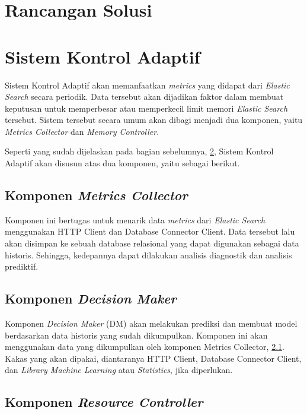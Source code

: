\section{Rancangan Solusi}

\section{Sistem Kontrol Adaptif}
\label{sec:sistemkontroladaptif}

Sistem Kontrol Adaptif akan memanfaatkan \textit{metrics} yang didapat dari \textit{Elastic Search} secara periodik. Data tersebut akan dijadikan faktor dalam membuat keputusan untuk memperbesar atau memperkecil limit memori \textit{Elastic Search} tersebut. Sistem tersebut secara umum akan dibagi menjadi dua komponen, yaitu \textit{Metrics Collector} dan \textit{Memory Controller}.

Seperti yang sudah dijelaskan pada bagian sebelumnya, \ref{sec:sistemkontroladaptif}, Sistem Kontrol Adaptif akan disusun atas dua komponen, yaitu sebagai berikut.
\subsection{Komponen \textit{Metrics Collector}}
\label{sec:metricscollector}

Komponen ini bertugas untuk menarik data \textit{metrics} dari \textit{Elastic Search} menggunakan HTTP Client dan Database Connector Client. Data tersebut lalu akan disimpan ke sebuah database relasional yang dapat digunakan sebagai data historis. Sehingga, kedepannya dapat dilakukan analisis diagnostik dan analisis prediktif.

\subsection{Komponen \textit{Decision Maker}}
Komponen \textit{Decision Maker} (DM) akan melakukan prediksi dan membuat model berdasarkan data historis yang sudah dikumpulkan.
Komponen ini akan menggunakan data yang dikumpulkan oleh komponen Metrics Collector, \ref{sec:metricscollector}.
Kakas yang akan dipakai, diantaranya HTTP Client, Database Connector Client, dan \textit{Library Machine Learning} atau \textit{Statistics}, jika diperlukan.

\subsection{Komponen \textit{Resource Controller}}

